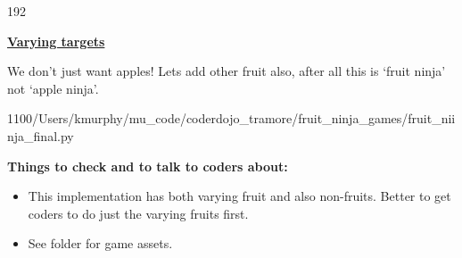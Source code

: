 \documentclass{coderdojo}
\def\MUcode{/Users/kmurphy/mu_code/coderdojo_tramore/fruit_ninja_games/}
\newcommand\contentsitem[2]{
	\item \hyperref[#1]{\color{section}\bfseries #2}
}
\begin{document}
\begin{dingautolist}{192}
\contentsitem{rectangle}{Varying targets} 

We don't just want apples! Lets add other fruit also, after all this is `fruit ninja' not `apple ninja'.

	{1}{100}{\MUcode}{fruit_niinja_final.py}  
	
{\bf Things to check and to talk to coders about:}

\begin{itemize}
\item
This implementation has both varying fruit and also non-fruits.  Better to get coders to do just the varying fruits first. 
\item
See  folder for game assets.
\end{itemize}
\clearpage

\end{dingautolist}
\end{document}
